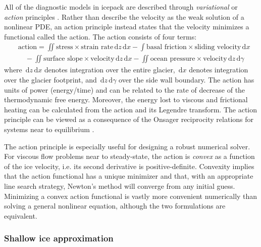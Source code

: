 \documentclass{article}
\theoremstyle{definition}
\theoremstyle{plain}
\newcommand{\ud}{\hspace{2pt}\mathrm{d}}
\begin{document}
All of the diagnostic models in icepack are described through \emph{variational} or \emph{action} principles \citep{dukowicz2010consistent}.
Rather than describe the velocity as the weak solution of a nonlinear PDE, an action principle instead states that the velocity minimizes a functional called the action.
The action consists of four terms:
\begin{align}
    & \text{action} = \iint\text{stress} \times \text{strain rate}\ud z\ud x - \int\text{basal friction} \times \text{sliding velocity}\ud x \nonumber \\
    & \quad - \iint\text{surface slope}\times\text{velocity}\ud z\ud x - \iint\text{ocean pressure}\times\text{velocity}\ud z\ud \gamma
    \label{action-functional}
\end{align}
where $\ud z\ud x$ denotes integration over the entire glacier, $\ud x$ denotes integration over the glacier footprint, and $\ud z\ud\gamma$ over the side wall boundary.
The action has units of power (energy/time) and can be related to the rate of decrease of the thermodynamic free energy.
Moreover, the energy lost to viscous and frictional heating can be calculated from the action and its Legendre transform.
The action principle can be viewed as a consequence of the Onsager reciprocity relations for systems near to equilibrium \citep{de2013non}.

The action principle is especially useful for designing a robust numerical solver.
For viscous flow problems near to steady-state, the action is \emph{convex} as a function of the ice velocity, i.e. its second derivative is positive-definite.
Convexity implies that the action functional has a unique minimizer and that, with an appropriate line search strategy, Newton's method will converge from any initial guess.
Minimizing a convex action functional is vastly more convenient numerically than solving a general nonlinear equation, although the two formulations are equivalent.

\subsubsection{Shallow ice approximation}
\end{document}
